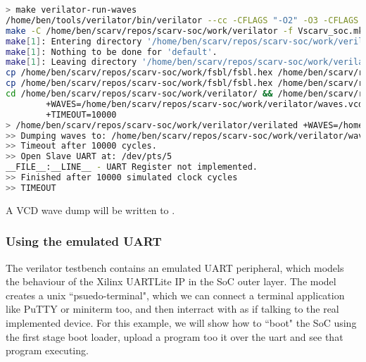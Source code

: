 \begin{itemize}
\begin{lstlisting}[language=bash,style=block]
> make verilator-run-waves
/home/ben/tools/verilator/bin/verilator --cc -CFLAGS "-O2" -O3 -CFLAGS -g -I/home/ben/scarv/repos/scarv-soc/extern/scarv-cpu/rtl/core --exe --trace --top-module scarv_soc   --Mdir /home/ben/scarv/repos/scarv-soc/work/verilator -o /home/ben/scarv/repos/scarv-soc/work/verilator/verilated -GBRAM_ROM_MEMH_FILE="\"rom.hex\"" -GBRAM_RAM_MEMH_FILE="\"ram.hex\"" -f /home/ben/scarv/repos/scarv-soc/flow/verilator/scarv-soc-rtl.manifest -f /home/ben/scarv/repos/scarv-soc/flow/verilator/scarv-soc-testbench.manifest
make -C /home/ben/scarv/repos/scarv-soc/work/verilator -f Vscarv_soc.mk
make[1]: Entering directory '/home/ben/scarv/repos/scarv-soc/work/verilator'
make[1]: Nothing to be done for 'default'.
make[1]: Leaving directory '/home/ben/scarv/repos/scarv-soc/work/verilator'
cp /home/ben/scarv/repos/scarv-soc/work/fsbl/fsbl.hex /home/ben/scarv/repos/scarv-soc/work/verilator/rom.hex
cp /home/ben/scarv/repos/scarv-soc/work/fsbl/fsbl.hex /home/ben/scarv/repos/scarv-soc/work/verilator/ram.hex
cd /home/ben/scarv/repos/scarv-soc/work/verilator/ && /home/ben/scarv/repos/scarv-soc/work/verilator/verilated  \
        +WAVES=/home/ben/scarv/repos/scarv-soc/work/verilator/waves.vcd \
        +TIMEOUT=10000
> /home/ben/scarv/repos/scarv-soc/work/verilator/verilated +WAVES=/home/ben/scarv/repos/scarv-soc/work/verilator/waves.vcd +TIMEOUT=10000 
>> Dumping waves to: /home/ben/scarv/repos/scarv-soc/work/verilator/waves.vcd
>> Timeout after 10000 cycles.
>> Open Slave UART at: /dev/pts/5
__FILE__:__LINE__ - UART Register not implemented.
>> Finished after 10000 simulated clock cycles
>> TIMEOUT
\end{lstlisting}

    A VCD wave dump will be written to .

\end{itemize}

\subsubsection{Using the emulated UART}
\label{sec:flow:verilator:uart}

The verilator testbench contains an emulated UART peripheral, which
models the behaviour of the Xilinx UARTLite IP in the SoC outer layer.
The model creates a unix ``psuedo-terminal", which we can connect
a terminal application like PuTTY or miniterm too, and then interract with
as if talking to the real implemented device.
For this example, we will show how to ``boot" the SoC using the first stage
boot loader, upload a program too it over the uart and see that program
executing.

